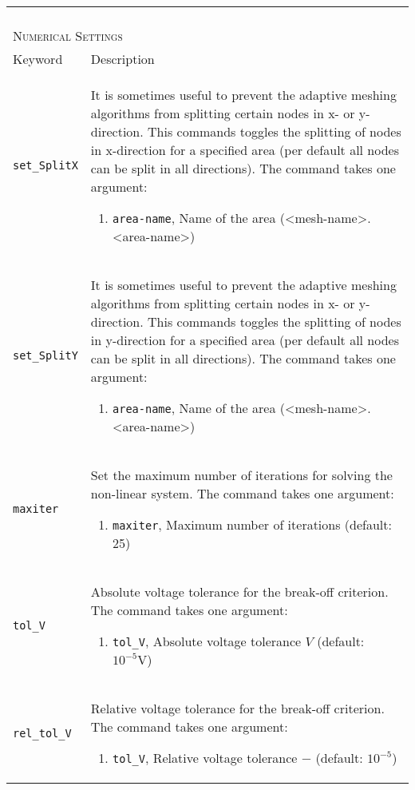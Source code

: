 \documentclass[noshowpacs,preprintnumbers,amsmath,amssymb, letter]{revtex4}
\begin{document}
\begin{longtable}{p{}p{}}
\begin{enumerate}
\end{enumerate}\\
\multicolumn{2}{l}{\textsc{Numerical Settings}} \\*
\hline
Keyword & Description \\
\texttt{set\_SplitX}	&  It is sometimes useful to prevent the adaptive meshing algorithms from splitting certain nodes in x- or y-direction. This commands toggles the splitting of nodes in x-direction for a specified area (per default all nodes can be split in all directions). The command takes one argument:
\begin{enumerate}
\item \texttt{area-name}, Name of the area (\textless mesh-name\textgreater .\textless area-name\textgreater )
\end{enumerate}\\
\texttt{set\_SplitY}	&  It is sometimes useful to prevent the adaptive meshing algorithms from splitting certain nodes in x- or y-direction. This commands toggles the splitting of nodes in y-direction for a specified area (per default all nodes can be split in all directions). The command takes one argument:
\begin{enumerate}
\item \texttt{area-name}, Name of the area (\textless mesh-name\textgreater .\textless area-name\textgreater )
\end{enumerate}\\
\texttt{maxiter}	&  Set the maximum number of iterations for solving the non-linear system. The command takes one argument:
\begin{enumerate}
\item \texttt{maxiter}, Maximum number of iterations (default: 25)
\end{enumerate}\\
\texttt{tol\_V}	&  Absolute voltage tolerance for the break-off criterion. The command takes one argument:
\begin{enumerate}
\item \texttt{tol\_V}, Absolute voltage tolerance $V$ (default: $10^{-5} \text{V}$)
\end{enumerate}\\
\texttt{rel\_tol\_V}	&  Relative voltage tolerance for the break-off criterion. The command takes one argument:
\begin{enumerate}
\item \texttt{tol\_V}, Relative voltage tolerance $-$ (default: $10^{-5}$)
\end{enumerate}\\

\end{longtable}
\end{document}
